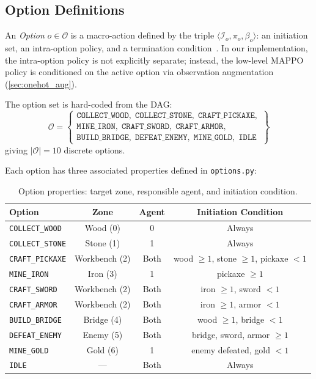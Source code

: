 \subsection{Option Definitions}
\label{sec:option_defs}

An \emph{Option} $o\in\mathcal{O}$ is a macro-action defined by the
triple $\langle \mathcal{I}_o, \pi_o, \beta_o \rangle$: an initiation
set, an intra-option policy, and a termination condition~\parencite{Sutton_Precup_Singh_1999}.
In our implementation, the intra-option policy is not explicitly
separate; instead, the low-level MAPPO policy is conditioned on the
active option via observation augmentation (\cref{sec:onehot_aug}).

The option set is hard-coded from the DAG:
\begin{equation}
\label{eq:option_set}
\mathcal{O} = \left\{
\begin{array}{l}
    \texttt{COLLECT\_WOOD},\;
    \texttt{COLLECT\_STONE},\;
    \texttt{CRAFT\_PICKAXE},\\
    \texttt{MINE\_IRON},\;
    \texttt{CRAFT\_SWORD},\;
    \texttt{CRAFT\_ARMOR},\\
    \texttt{BUILD\_BRIDGE},\;
    \texttt{DEFEAT\_ENEMY},\;
    \texttt{MINE\_GOLD},\;
    \texttt{IDLE}
\end{array}
\right\}
\end{equation}
giving $|\mathcal{O}|=10$ discrete options.

Each option has three associated properties defined in \texttt{options.py}:

\begin{table}[H]
\centering
\caption{Option properties: target zone, responsible agent, and initiation condition.}
\label{tab:option_props}
\small
\begin{tabular}{@{}lccc@{}}
\toprule
\textbf{Option} & \textbf{Zone} & \textbf{Agent} & \textbf{Initiation Condition} \\
\midrule
\texttt{COLLECT\_WOOD}  & Wood (0)      & 0     & Always \\
\texttt{COLLECT\_STONE} & Stone (1)     & 1     & Always \\
\texttt{CRAFT\_PICKAXE} & Workbench (2) & Both  & wood $\ge 1$, stone $\ge 1$, pickaxe $< 1$ \\
\texttt{MINE\_IRON}     & Iron (3)      & 1     & pickaxe $\ge 1$ \\
\texttt{CRAFT\_SWORD}   & Workbench (2) & Both  & iron $\ge 1$, sword $< 1$ \\
\texttt{CRAFT\_ARMOR}   & Workbench (2) & Both  & iron $\ge 1$, armor $< 1$ \\
\texttt{BUILD\_BRIDGE}  & Bridge (4)    & Both  & wood $\ge 1$, bridge $< 1$ \\
\texttt{DEFEAT\_ENEMY}  & Enemy (5)     & Both  & bridge, sword, armor $\ge 1$ \\
\texttt{MINE\_GOLD}     & Gold (6)      & 1     & enemy defeated, gold $< 1$ \\
\texttt{IDLE}           & ---           & Both  & Always \\
\bottomrule
\end{tabular}
\end{table}

